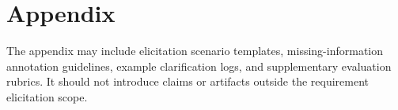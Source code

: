\section{Appendix}
\label{appendix}

The appendix may include elicitation scenario templates, missing-information annotation guidelines, example clarification logs, and supplementary evaluation rubrics.
It should not introduce claims or artifacts outside the requirement elicitation scope.
